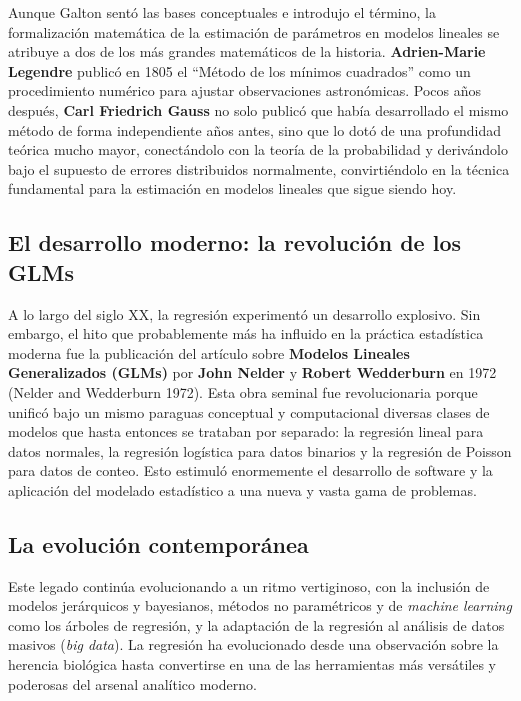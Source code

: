 \documentclass[
  letterpaper,
  DIV=11,
  numbers=noendperiod]{scrreprt}
\begin{document}
Aunque Galton sentó las bases conceptuales e introdujo el término, la
formalización matemática de la estimación de parámetros en modelos
lineales se atribuye a dos de los más grandes matemáticos de la
historia. \textbf{Adrien-Marie Legendre} publicó en 1805 el ``Método de
los mínimos cuadrados'' como un procedimiento numérico para ajustar
observaciones astronómicas. Pocos años después, \textbf{Carl Friedrich
Gauss} no solo publicó que había desarrollado el mismo método de forma
independiente años antes, sino que lo dotó de una profundidad teórica
mucho mayor, conectándolo con la teoría de la probabilidad y derivándolo
bajo el supuesto de errores distribuidos normalmente, convirtiéndolo en
la técnica fundamental para la estimación en modelos lineales que sigue
siendo hoy.

\subsection{El desarrollo moderno: la revolución de los
GLMs}\label{el-desarrollo-moderno-la-revoluciuxf3n-de-los-glms}

A lo largo del siglo XX, la regresión experimentó un desarrollo
explosivo. Sin embargo, el hito que probablemente más ha influido en la
práctica estadística moderna fue la publicación del artículo sobre
\textbf{Modelos Lineales Generalizados (GLMs)} por \textbf{John Nelder}
y \textbf{Robert Wedderburn} en 1972 (Nelder and Wedderburn 1972). Esta
obra seminal fue revolucionaria porque unificó bajo un mismo paraguas
conceptual y computacional diversas clases de modelos que hasta entonces
se trataban por separado: la regresión lineal para datos normales, la
regresión logística para datos binarios y la regresión de Poisson para
datos de conteo. Esto estimuló enormemente el desarrollo de software y
la aplicación del modelado estadístico a una nueva y vasta gama de
problemas.

\subsection{La evolución
contemporánea}\label{la-evoluciuxf3n-contemporuxe1nea}

Este legado continúa evolucionando a un ritmo vertiginoso, con la
inclusión de modelos jerárquicos y bayesianos, métodos no paramétricos y
de \emph{machine learning} como los árboles de regresión, y la
adaptación de la regresión al análisis de datos masivos (\emph{big
data}). La regresión ha evolucionado desde una observación sobre la
herencia biológica hasta convertirse en una de las herramientas más
versátiles y poderosas del arsenal analítico moderno.
\end{document}
